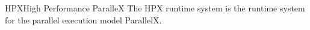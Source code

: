 %
{HPX}{High Performance ParalleX}{
    The HPX runtime system is the runtime system for the parallel execution
    model ParallelX.%
}
